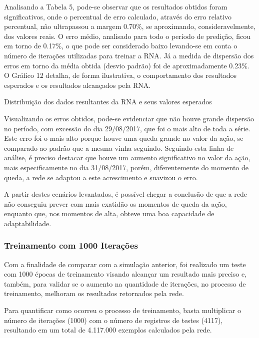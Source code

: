 Analisando a Tabela 5, pode-se observar que os resultados obtidos foram significativos, onde o percentual de erro calculado, através do erro relativo percentual, não ultrapassou a margem 0.70\%, se aproximando, consideravelmente, dos valores reais. O erro médio, analisado para todo o período de predição, ficou em torno de 0.17\%, o que pode ser considerado baixo levando-se em conta o número de iterações utilizadas para treinar a RNA. Já a medida de dispersão dos erros em torno da média obtida (desvio padrão) foi de aproximadamente 0.23\%. O Gráfico 12 detalha, de forma ilustrativa, o comportamento dos resultados esperados e os resultados alcançados pela RNA.
\begin{grafico}[h]
	\centering
	\caption{Distribuição dos dados resultantes da RNA e seus valores esperados}
	\label{lingua}
\end{grafico}

Visualizando os erros obtidos, pode-se evidenciar que não houve grande dispersão no período, com excessão do dia 29/08/2017, que foi o mais alto de toda a série. Este erro foi o mais alto porque houve uma queda grande no valor da ação, se comparado ao padrão que a mesma vinha seguindo. Seguindo esta linha de análise, é preciso destacar que houve um aumento significativo no valor da ação, mais especificamente no dia 31/08/2017, porém, diferentemente do momento de queda, a rede se adaptou a este acrescimento e suavizou o erro. 

A partir destes cenários levantados, é possível chegar a conclusão de que a rede não conseguiu prever com mais exatidão os momentos de queda da ação, enquanto que, nos momentos de alta, obteve uma boa capacidade de adaptabilidade.

\subsubsection{Treinamento com 1000 Iterações}	
Com a finalidade de comparar com a simulação anterior, foi realizado um teste com 1000 épocas de treinamento visando alcançar um resultado mais preciso e, também, para validar se o aumento na quantidade de iterações, no processo de treinamento, melhoram os resultados retornados pela rede.

Para quantificar como ocorreu o processo de treinamento, basta multiplicar o número de iterações (1000) com o número de registros de testes (4117), resultando em um total de 4.117.000 exemplos calculados pela rede.

